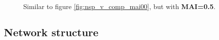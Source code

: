 \begin{figure}
	\centering	
	\renewcommand{\thesubfigure}{}
	\setlength{\subfloatlabelskip}{0pt}
	\caption[Number of initial species versus persistence, MAI=0.5.]{Similar to figure \ref{fig:nsp_v_comp_mai00}, but with \textbf{MAI=0.5}.}
	\label{fig:nsp_v_comp_mai05}
\end{figure}

\subsection{Network structure}
\label{sec:netstruct_v_p}


